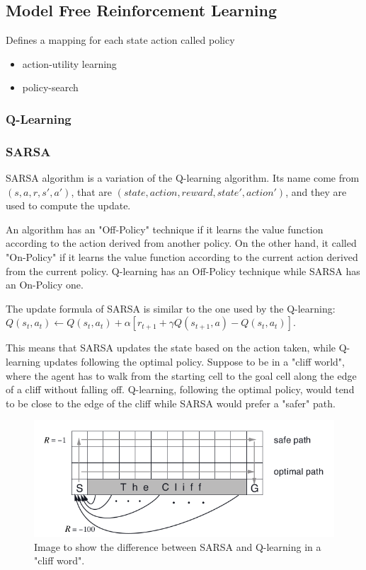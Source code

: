 \subsection{Model Free Reinforcement Learning}
Defines a mapping for each state action called policy

\begin{itemize}
    \item action-utility learning
    \item policy-search
\end{itemize}

\subsubsection{Q-Learning}
\subsubsection{SARSA}
SARSA algorithm \cite{qiang2011reinforcement} is a variation of the Q-learning algorithm.
Its name come from $(s, a, r, s', a')$, that are $(state, action, reward, state', action')$, and they are used to compute the update.

An algorithm has an "Off-Policy" technique if it learns the value function according to the action derived from another policy. On the other hand, it called "On-Policy" if it learns the value function according to the current action derived from the current policy.
Q-learning has an Off-Policy technique while SARSA has an On-Policy one.

The update formula of SARSA is similar to the one used by the Q-learning: $Q(s_t, a_t) \leftarrow Q(s_t, a_t) + \alpha [r_{t+1} + \gamma Q(s_{t+1}, a) - Q(s_t, a_t)]$.

This means that SARSA updates the state based on the action taken, while Q-learning updates following the optimal policy.
Suppose to be in a "cliff world", where the agent has to walk from the starting cell to the goal cell along the edge of a cliff without falling off. Q-learning, following the optimal policy, would tend to be close to the edge of the cliff while SARSA would prefer a "safer" path.

\begin{figure}[ht]
    \centering
    \includegraphics[scale=0.4]{images/cliff_word.png}
    \caption{Image to show the difference between SARSA and Q-learning in a "cliff word".}
\end{figure}

